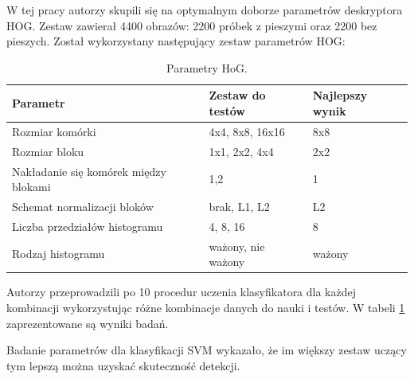 W tej pracy autorzy skupili się na optymalnym doborze parametrów deskryptora HOG. 
Zestaw zawierał 4400 obrazów: 2200 próbek z pieszymi oraz 2200 bez pieszych. 
Został wykorzystany następujący zestaw parametrów HOG:
\begin{table}[!h]
\centering 
\begin{threeparttable}
\caption{Parametry HoG.}
\label{tab:parametryhog}
\begin{tabularx}{1\textwidth}{|l|X|X|}


\hline Parametr & Zestaw do testów & Najlepszy wynik \\ 
\hline Rozmiar komórki & 4x4, 8x8, 16x16 & 8x8 \\ 
\hline Rozmiar bloku & 1x1, 2x2, 4x4 & 2x2 \\ 
\hline Nakładanie się komórek między blokami & 1,2 & 1 \\ 
\hline Schemat normalizacji bloków & brak, L1, L2 & L2 \\ 
\hline Liczba przedziałów histogramu & 4, 8, 16 & 8 \\ 
\hline Rodzaj histogramu & ważony, nie ważony & ważony \\ 
\hline 


\end{tabularx} 
\end{threeparttable}
\end{table} 

Autorzy przeprowadzili po 10 procedur uczenia klasyfikatora dla każdej kombinacji wykorzystując różne kombinacje danych do nauki i testów. W tabeli \ref{tab:parametryhog} zaprezentowane są wyniki badań.

Badanie parametrów dla klasyfikacji SVM wykazało, że im większy zestaw uczący tym lepszą można uzyskać skuteczność detekcji. 




